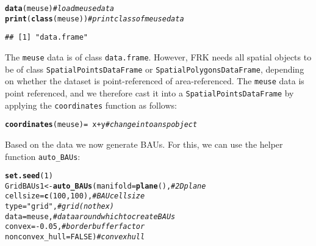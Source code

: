 \documentclass{article}\usepackage[]{graphicx}\usepackage[]{color}
\makeatletter
\newcommand{\hlnum}[1]{\textcolor[rgb]{0.686,0.059,0.569}{#1}}%
\newcommand{\hlstr}[1]{\textcolor[rgb]{0.192,0.494,0.8}{#1}}%
\newcommand{\hlcom}[1]{\textcolor[rgb]{0.678,0.584,0.686}{\textit{#1}}}%
\newcommand{\hlopt}[1]{\textcolor[rgb]{0,0,0}{#1}}%
\newcommand{\hlstd}[1]{\textcolor[rgb]{0.345,0.345,0.345}{#1}}%
\newcommand{\hlkwb}[1]{\textcolor[rgb]{0.69,0.353,0.396}{#1}}%
\newcommand{\hlkwc}[1]{\textcolor[rgb]{0.333,0.667,0.333}{#1}}%
\newcommand{\hlkwd}[1]{\textcolor[rgb]{0.737,0.353,0.396}{\textbf{#1}}}%
\newenvironment{kframe}{%
 \def\at@end@of@kframe{}%
 \ifinner\ifhmode%
  \def\at@end@of@kframe{\end{minipage}}%
  \begin{minipage}{\columnwidth}%
 \fi\fi%
 \def\FrameCommand##1{\hskip\@totalleftmargin \hskip-\fboxsep
 \colorbox{shadecolor}{##1}\hskip-\fboxsep
     \hskip-\linewidth \hskip-\@totalleftmargin \hskip\columnwidth}%
 \MakeFramed {\advance\hsize-\width
   \@totalleftmargin\z@ \linewidth\hsize
   \@setminipage}}%
 {\par\unskip\endMakeFramed%
 \at@end@of@kframe}
\newenvironment{knitrout}{}{} %
\renewcommand{\tt} {\texttt}
\newcommand{\pkg}[1]{{\fontseries{b}\selectfont #1}}
\makeatother
\begin{document}
\begin{knitrout}
\color{fgcolor}\begin{kframe}
\begin{alltt}
\hlkwd{data}\hlstd{(meuse)}            \hlcom{# load meuse data}
\hlkwd{print}\hlstd{(}\hlkwd{class}\hlstd{(meuse))}    \hlcom{# print class of meuse data}
\end{alltt}
\begin{verbatim}
## [1] "data.frame"
\end{verbatim}
\end{kframe}
\end{knitrout}
\noindent The \texttt{meuse} data is of class \texttt{data.frame}. However, \pkg{FRK} needs all spatial objects to be of class \texttt{SpatialPointsDataFrame} or \texttt{SpatialPolygonsDataFrame}, depending on whether the dataset is point-referenced of area-referenced. The \tt{meuse} data is point referenced, and we therefore cast it into a \texttt{SpatialPointsDataFrame} by applying the \tt{coordinates} function as follows:

\begin{knitrout}
\color{fgcolor}\begin{kframe}
\begin{alltt}
\hlkwd{coordinates}\hlstd{(meuse)} \hlkwb{=} \hlopt{~}\hlstd{x}\hlopt{+}\hlstd{y}     \hlcom{# change into an sp object}
\end{alltt}
\end{kframe}
\end{knitrout}

\vspace{0.1in}

 Based on the data we now generate BAUs. For this, we can use the helper function \tt{auto\_BAUs}:

\begin{knitrout}
\color{fgcolor}\begin{kframe}
\begin{alltt}
\hlkwd{set.seed}\hlstd{(}\hlnum{1}\hlstd{)}
\hlstd{GridBAUs1} \hlkwb{<-} \hlkwd{auto_BAUs}\hlstd{(}\hlkwc{manifold} \hlstd{=} \hlkwd{plane}\hlstd{(),}    \hlcom{# 2D plane}
                     \hlkwc{cellsize} \hlstd{=} \hlkwd{c}\hlstd{(}\hlnum{100}\hlstd{,}\hlnum{100}\hlstd{),}   \hlcom{# BAU cellsize}
                     \hlkwc{type} \hlstd{=} \hlstr{"grid"}\hlstd{,}           \hlcom{# grid (not hex)}
                     \hlkwc{data} \hlstd{= meuse,}            \hlcom{# data around which to create BAUs}
                     \hlkwc{convex}\hlstd{=}\hlopt{-}\hlnum{0.05}\hlstd{,}            \hlcom{# border buffer factor}
                     \hlkwc{nonconvex_hull}\hlstd{=}\hlnum{FALSE}\hlstd{)}    \hlcom{# convex hull}
\end{alltt}
\end{kframe}
\end{knitrout}
\end{document}
